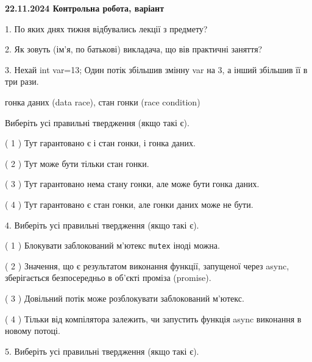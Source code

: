 \documentclass[12pt, ukrainian]{article}
\def\code#1{\Verb!#1!}
\begin{document}
\vspace{4mm}
\newpage
\begin {large}

\textbf{22.11.2024 Контрольна робота, варіант  }\par


{
1. По яких днях тижня відбувались лекції з предмету?



\vspace{5mm}
2. Як зовуть (ім'я, по батькові) викладача, що вів практичні заняття?



\vspace{5mm}
3. Нехай int var=13; Один потік збільшив змінну var на 3, а інший збільшив її в три рази.

гонка даних (data race), стан гонки (race condition)

Виберіть усі правильні твердження (якщо такі є).\par
\vspace{2mm}
( 1 ) Тут гарантовано є і стан гонки, і гонка даних.%

( 2 ) Тут може бути тільки стан гонки.%

( 3 ) Тут гарантовано нема стану гонки, але може бути гонка даних.%

( 4 ) Тут гарантовано є стан гонки, але гонки даних може не бути.%


\vspace{5mm}
4. Виберіть усі правильні твердження (якщо такі є).\par
\vspace{2mm}

( 1 ) Блокувати заблокований м’ютекс  \code{mutex} іноді можна.%

( 2 ) Значення, що є результатом виконання функції, запущеної через async, зберігається безпосередньо в об’єкті проміза (promise).%

( 3 ) Довільний потік може розблокувати заблокований м’ютекс.%

( 4 ) Тільки від компілятора залежить, чи запустить функція async виконання в новому потоці.%


\vspace{5mm}
5. Виберіть усі правильні твердження (якщо такі є).\par
\vspace{2mm}

}
\end{large}
\end{document}
